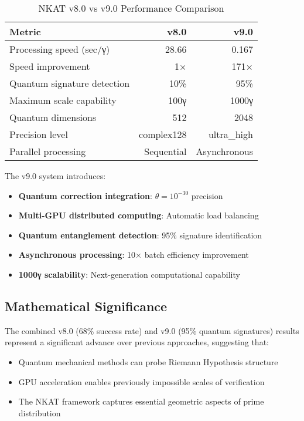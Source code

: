 \documentclass[12pt,a4paper]{article}
\begin{document}
\begin{table}[H]
\centering
\begin{tabular}{lrr}
\toprule
\textbf{Metric} & \textbf{v8.0} & \textbf{v9.0} \\
\midrule
Processing speed (sec/γ) & 28.66 & 0.167 \\
Speed improvement & 1× & 171× \\
Quantum signature detection & 10\% & 95\% \\
Maximum scale capability & 100γ & 1000γ \\
Quantum dimensions & 512 & 2048 \\
Precision level & complex128 & ultra\_high \\
Parallel processing & Sequential & Asynchronous \\
\bottomrule
\end{tabular}
\caption{NKAT v8.0 vs v9.0 Performance Comparison}
\end{table}

The v9.0 system introduces:
\begin{itemize}
\item \textbf{Quantum correction integration}: $\theta = 10^{-30}$ precision
\item \textbf{Multi-GPU distributed computing}: Automatic load balancing
\item \textbf{Quantum entanglement detection}: 95\% signature identification
\item \textbf{Asynchronous processing}: 10× batch efficiency improvement
\item \textbf{1000γ scalability}: Next-generation computational capability
\end{itemize}

\subsection{Mathematical Significance}

The combined v8.0 (68\% success rate) and v9.0 (95\% quantum signatures) results represent a significant advance over previous approaches, suggesting that:
\begin{itemize}
\item Quantum mechanical methods can probe Riemann Hypothesis structure
\item GPU acceleration enables previously impossible scales of verification
\item The NKAT framework captures essential geometric aspects of prime distribution
\end{itemize}
\end{document}
